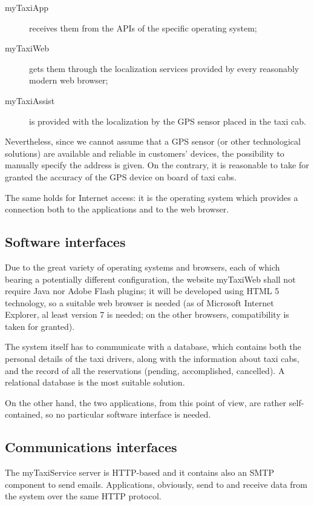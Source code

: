\begin{description}
	\item [myTaxiApp] receives them from the APIs of the specific operating system;
	\item [myTaxiWeb] gets them through the localization services provided by every reasonably modern web browser;
	\item [myTaxiAssist] is provided with the localization by the GPS sensor placed in the taxi cab.
\end{description}

Nevertheless, since we cannot assume that a GPS sensor (or other technological solutions) are available and reliable in customers’ devices, the possibility to manually specify the address is given. On the contrary, it is reasonable to take for granted the accuracy of the GPS device on board of taxi cabs.   

The same holds for Internet access: it is the operating system which provides a connection both to the applications and to the web browser.


\subsection{Software interfaces} 

Due to the great variety of operating systems and browsers, each of which bearing a potentially different configuration, the website myTaxiWeb shall not require Java nor Adobe Flash plugins; it will be developed using HTML 5 technology, so a suitable web browser is needed (as of Microsoft Internet Explorer, al least version 7 is needed; on the other browsers, compatibility is taken for granted). 

The system itself has to communicate with a database, which contains both the personal details of the taxi drivers, along with the information about taxi cabs, and the record of all the reservations (pending, accomplished, cancelled). A relational database is the most suitable solution.

On the other hand, the two applications, from this point of view, are rather self-contained, so no particular software interface is needed.


\subsection{Communications interfaces}

The myTaxiService server is HTTP-based and it contains also an SMTP component to send emails. Applications, obviously, send to and receive data from the system over the same HTTP protocol.

